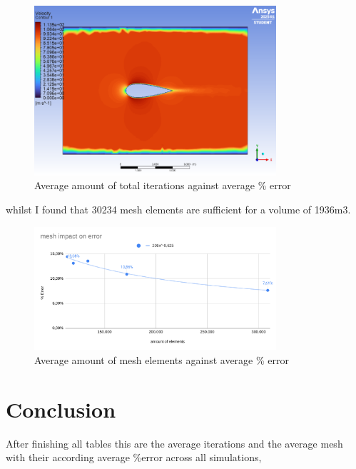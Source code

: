 \documentclass[12pt,a4paper]{article}
\begin{document}
\begin{figure}[H]
\centering
\includegraphics[width=0.8\textwidth]{image11.png}
\caption{Average amount of total iterations against average \% error}
\label{fig:iterations_final}
\end{figure}

whilst I found that 30234 mesh elements are sufficient for a volume of 1936m3.

\begin{figure}[H]
\centering
\includegraphics[width=0.8\textwidth]{image2.png}
\caption{Average amount of mesh elements against average \% error}
\label{fig:mesh_final}
\end{figure}

\section{Conclusion}

After finishing all tables this are the average iterations and the average mesh with their according average \%error across all simulations,
\end{document}
